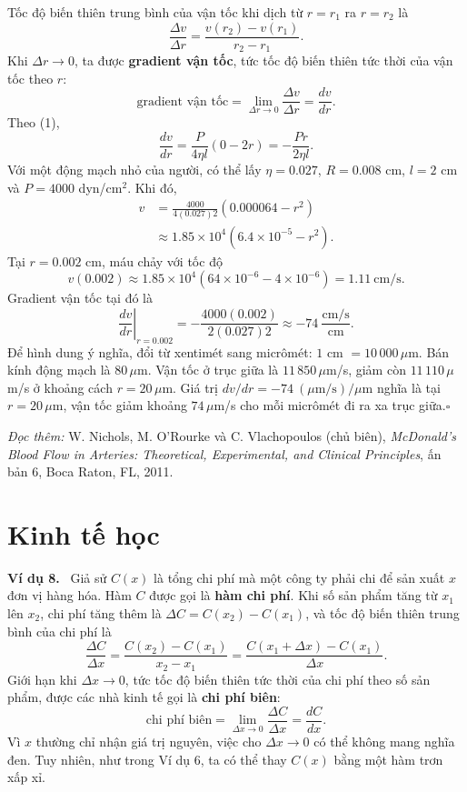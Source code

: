 \documentclass[12pt,a4paper]{article}
\newcommand{\ex}[1]{\par\medskip\noindent\textbf{Ví dụ #1.}\ }
\begin{document}
Tốc độ biến thiên trung bình của vận tốc khi dịch từ $r=r_1$ ra $r=r_2$ là
\[\frac{\Delta v}{\Delta r}=\frac{v(r_2)-v(r_1)}{r_2-r_1}.\]
Khi $\Delta r\to0$, ta được \textbf{gradient vận tốc}, tức tốc độ biến thiên tức thời của vận tốc theo $r$:
\[\text{gradient vận tốc}=\lim_{\Delta r\to0}\frac{\Delta v}{\Delta r}=\frac{dv}{dr}.\]
Theo (1),
\[\frac{dv}{dr}=\frac P{4\eta l}(0-2r)=-\frac{Pr}{2\eta l}.\]
Với một động mạch nhỏ của người, có thể lấy $\eta=0.027$, $R=0.008$ cm, $l=2$ cm và $P=4000$ dyn/cm$^2$. Khi đó,
\begin{align*}
v&=\frac{4000}{4(0.027)2}(0.000064-r^2)\\
&\approx1.85\times10^4(6.4\times10^{-5}-r^2).
\end{align*}
Tại $r=0.002$ cm, máu chảy với tốc độ
\[v(0.002)\approx1.85\times10^4(64\times10^{-6}-4\times10^{-6})=1.11\ \mathrm{cm/s}.\]
Gradient vận tốc tại đó là
\[\left.\frac{dv}{dr}\right|_{r=0.002}=-\frac{4000(0.002)}{2(0.027)2}\approx-74\ \frac{\mathrm{cm/s}}{\mathrm{cm}}.\]
Để hình dung ý nghĩa, đổi từ xentimét sang micrômét: $1$ cm $=10\,000\,\mu$m. Bán kính động mạch là $80\,\mu$m. Vận tốc ở trục giữa là $11\,850\,\mu$m/s, giảm còn $11\,110\,\mu$m/s ở khoảng cách $r=20\,\mu$m. Giá trị $dv/dr=-74\ (\mu\mathrm{m/s})/\mu\mathrm m$ nghĩa là tại $r=20\,\mu$m, vận tốc giảm khoảng $74\,\mu$m/s cho mỗi micrômét đi ra xa trục giữa.\hfill$\square$

\noindent\textit{Đọc thêm:} W. Nichols, M. O'Rourke và C. Vlachopoulos (chủ biên), \textit{McDonald's Blood Flow in Arteries: Theoretical, Experimental, and Clinical Principles}, ấn bản 6, Boca Raton, FL, 2011.
\section*{Kinh tế học}
\ex{8} Giả sử $C(x)$ là tổng chi phí mà một công ty phải chi để sản xuất $x$ đơn vị hàng hóa. Hàm $C$ được gọi là \textbf{hàm chi phí}. Khi số sản phẩm tăng từ $x_1$ lên $x_2$, chi phí tăng thêm là $\Delta C=C(x_2)-C(x_1)$, và tốc độ biến thiên trung bình của chi phí là
\[\frac{\Delta C}{\Delta x}=\frac{C(x_2)-C(x_1)}{x_2-x_1}
=\frac{C(x_1+\Delta x)-C(x_1)}{\Delta x}.\]
Giới hạn khi $\Delta x\to0$, tức tốc độ biến thiên tức thời của chi phí theo số sản phẩm, được các nhà kinh tế gọi là \textbf{chi phí biên}:
\[\text{chi phí biên}=\lim_{\Delta x\to0}\frac{\Delta C}{\Delta x}=\frac{dC}{dx}.\]
Vì $x$ thường chỉ nhận giá trị nguyên, việc cho $\Delta x\to0$ có thể không mang nghĩa đen. Tuy nhiên, như trong Ví dụ 6, ta có thể thay $C(x)$ bằng một hàm trơn xấp xỉ.
\end{document}
